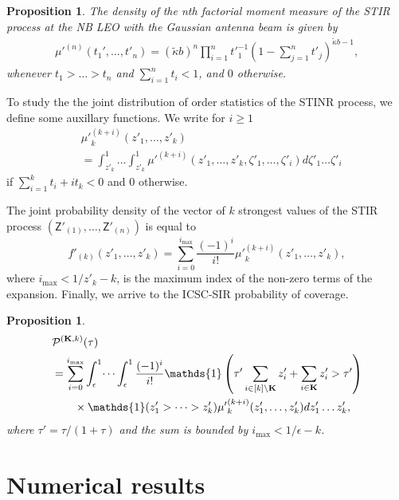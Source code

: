 \documentclass[conference]{IEEEtran}
\theoremstyle{definition}
\theoremstyle{plain}
\newtheorem{prop}[thm4]{Proposition}
\begin{document}
          

          
          \begin{prop}
            The density of the nth factorial moment measure of the STIR process at the NB LEO with the Gaussian antenna beam is given by
            \begin{align}
              \mu'^{(n)}(t_1',\dots,t'_n) = (\tilde{\kappa}b)^n\prod_{i=1}^n{t'}_{1}^{-1}\left(1- \sum_{j=1}^nt'_j \right)^{\tilde{\kappa}b-1},       
            \end{align}
            whenever $t_1>\dots >t_n$ and $\sum_{i=1}^n t_i <1$, and $0$ otherwise.
          \end{prop}
          To study the the joint distribution of order statistics of the STINR process, we define some auxillary functions. We write for $i\geq 1$
          \begin{align}
            \label{eq:auxillary}
                  &{\mu'}_k^{(k+i)}(z'_1,\dots,z'_k) \nonumber \\
                  &= \int_{z'_k}^1 \dots \int_{z'_k}^1 {\mu'}^{(k+i)}(z'_1,\dots,z'_k,\zeta'_1,\dots,\zeta'_i) d\zeta'_1 \dots \zeta'_i
          \end{align}
           if $\sum_{i=1}^k t_i + it_k <0$ and $0$ otherwise.

          
          The joint probability density of the vector of $k$ strongest values of the STIR process $(\mathsf{Z}'_{(1)}, \dots, \mathsf{Z}'_{(n)})$ is equal to
          \begin{equation} 
            f'_{(k)}(z'_1,\dots,z'_k)= \sum^{i_{\text{max}}}_{i=0}\frac{(-1)^i}{i!}{\mu'}_k^{(k+i)}(z'_1,\dots,z'_k),
          \end{equation}
          where $i_{\text{max}}<1/z'_k-k$, is the maximum index of the non-zero terms of the expansion.
          Finally, we arrive to the ICSC-SIR probability of coverage.
          \begin{prop}
            \begin{align}
              &\mathcal{P}^{(\mathbf{K},k)}(\tau) \nonumber\\
              &= \sum^{i_{\text{max}}}_{i=0} \int_{\epsilon}^1 \dots \int_{\epsilon}^1\frac{(-1)^i}{i!}\mathds{1}\left(\tau' \sum_{i \in [k] \setminus  \mathbf{K}}z'_i+ \sum_{i\in \mathbf{K}} z'_i>\tau' \right) \nonumber \\
              &\hspace{0.7cm}\times \mathds{1}(z'_1>\dots>z'_k) {\mu'}_k^{(k+i)}(z'_1,\dots,z'_k) d z'_1 \dots z'_k,
            \end{align}
            where $\tau' = \tau/(1+\tau)$ and the sum is bounded by $i_{\text{max}}< 1/\epsilon-k$. 
          \end{prop}


          
        

          
          
          
          \section{Numerical results}
          
          
          
          

          
         
         
             
             
\end{document}
